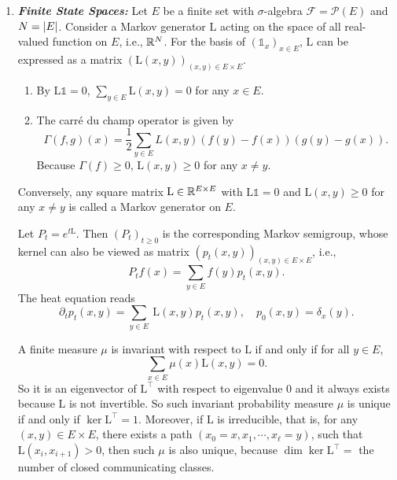 \begin{enumerate}[label=\arabic{*}.]
	\item \textbf{\emph{Finite State Spaces:}} Let $E$ be a finite set with $\sigma$-algebra $\mathcal{F} = \mathcal{P}(E)$ and $N = \left\lvert E\right\lvert$. Consider a Markov generator $\mathrm{L}$ acting on the space of all real-valued function on $E$, i.e., $\mathbb{R}^N$. For the basis of $(\mathds{1}_x)_{x \in E}$, $\mathrm{L}$ can be expressed as a matrix $(\mathrm{L}(x,y))_{(x,y) \in E \times E}$.
	\begin{enumerate}[label=(\roman*)]
		\item By $\mathrm{L} \mathds{1} = 0$, $\sum_{y \in E} \mathrm{L}(x,y) = 0$ for any $x\in E$.
		\item The carr\'e du champ operator is given by
		\begin{equation*}
		    \Gamma(f, g)(x)=\frac{1}{2} \sum_{y \in E} L(x, y)(f(y)-f(x))(g(y)-g(x)).
		\end{equation*}
		Because $\Gamma(f) \geq 0$, $\mathrm{L}(x,y) \geq 0$ for any $x \neq y$.
	\end{enumerate}
	Conversely, any square matrix $\mathrm{L} \in \mathbb{R}^{E \times E}$ with $\mathrm{L} \mathds{1} = 0$ and $\mathrm{L}(x,y) \geq 0$ for any $x \neq y$ is called a Markov generator on $E$.

	Let $P_t = e^{t\mathrm{L}}$. Then $(P_t)_{t \geq 0}$ is the corresponding Markov semigroup, whose kernel can also be viewed as matrix $(p_t(x,y))_{(x,y) \in E \times E}$, i.e.,
	\begin{equation*}
		P_t f(x)=\sum_{y \in E} f(y) p_t(x, y).
	\end{equation*}
	The heat equation reads
	\begin{equation*}
		\partial_t p_t(x, y)=\sum_{y \in E} \mathrm{~L}(x, y) p_t(x, y), \quad p_0(x, y)=\delta_x(y).
	\end{equation*}

	A finite measure $\mu$ is invariant with respect to $\mathrm{L}$ if and only if for all $y \in E$,
	\begin{equation*}
	    \sum_{x \in E}\mu(x)\mathrm{L}(x,y) = 0.
	\end{equation*}
	So it is an eigenvector of $\mathrm{L}^\top$ with respect to eigenvalue $0$ and it always exists because $\mathrm{L}$ is not invertible. So such invariant probability measure $\mu$ is unique if and only if $\ker \mathrm{L}^\top = 1$. Moreover, if $\mathrm{L}$ is irreducible, that is, for any $(x,y) \in E \times E$, there exists a path $(x_0=x,x_1,\cdots,x_\ell=y)$, such that $\mathrm{L}(x_i,x_{i+1}) > 0$, then such $\mu$ is also unique, because $\dim \ker \mathrm{L}^\top = $ the number of closed communicating classes.


\end{enumerate}
